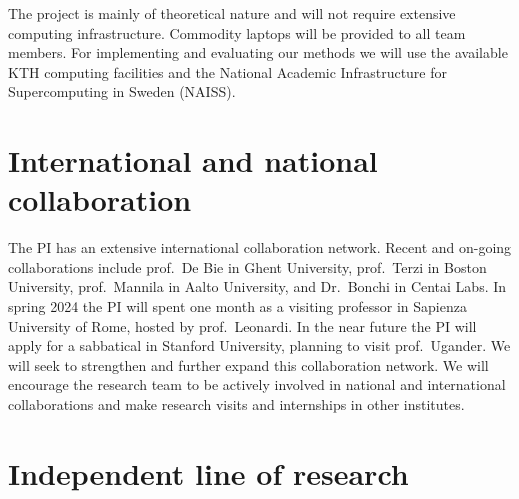 \documentclass[a4paper,11pt]{article}
\begin{document}

The project is mainly of theoretical nature and will not require extensive computing infrastructure. 
Commodity laptops will be provided to all team members. 
For implementing and evaluating our methods we will use the available 
KTH computing facilities
and the National Academic Infrastructure for Supercomputing in Sweden (NAISS).

\section{International and national collaboration}


The PI has an extensive international collaboration network. 
Recent and on-going collaborations include
prof.\ De Bie in Ghent University, 
prof.\ Terzi in Boston University,
prof.\ Mannila in Aalto University, and 
Dr.\ Bonchi in Centai Labs.
In spring 2024 the PI will spent one month as a visiting professor 
in Sapienza University of Rome, hosted by prof.\ Leonardi.
In the near future the PI will apply for a sabbatical in Stanford University, 
planning to visit prof.\ Ugander. 
We will seek to strengthen and further expand this collaboration network.
We will encourage the research team to be actively involved in national and international collaborations
and make research visits and internships in other institutes.

\section{Independent line of research}



\iffalse
{\small
\setlength{\bibsep}{0pt}


}
\fi

% 
\end{document}

